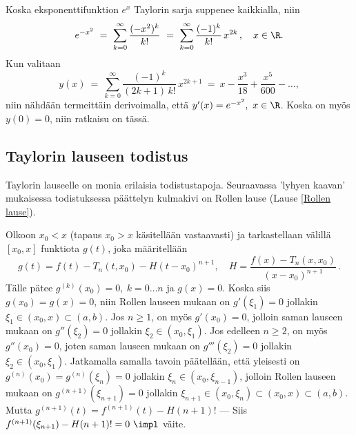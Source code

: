 \ratk Koska eksponenttifunktion $e^x$ Taylorin sarja suppenee kaikkialla, niin
\[ 
e^{-x^2}\ =\ \sum_{k=0}^\infty \frac{(-x^2)^k}{k!}\ 
          =\ \sum_{k=0}^\infty \frac{(-1)^k}{k!}\,x^{2k}\,, \quad x \in \R. 
\]
Kun valitaan
\[ 
y(x)\ =\ \sum_{k=0}^\infty \frac{(-1)^k}{(2k+1)\,k!}\,x^{2k+1}\ 
      =\ x - \frac{x^3}{18} + \frac{x^5}{600} - \ldots, 
\]
niin nähdään termeittäin derivoimalla, että $y'(x)=e^{-x^2},\ x\in\R$. Koska on myös $y(0)=0$,
niin ratkaisu on tässä. \loppu

\subsection*{Taylorin lauseen todistus}

Taylorin lauseelle on monia erilaisia todistustapoja. Seuraavassa
'lyhyen kaavan' mukaisessa todistuksessa päättelyn kulmakivi on Rollen lause
(Lause \ref{Rollen lause}).

Olkoon $x_0<x$ (tapaus $x_0>x$ käsitellään vastaavasti) ja tarkastellaan välillä $[x_0,x]$
funktiota $g(t)$, joka määritellään
\[
g(t) = f(t) - T_n(t,x_0) - H(t-x_0)^{n+1}, \quad H = \frac{f(x)-T_n(x,x_0)}{(x-x_0)^{n+1}}\,. 
\]
Tälle pätee $g^{(k)}(x_0)=0,\ k=0 \ldots n$ ja $g(x)=0$. Koska siis $g(x_0)=g(x)=0$, niin
Rollen lauseen mukaan on $g'(\xi_1)=0$ jollakin $\xi_1 \in (x_0,x)\subset(a,b)$. Jos $n \ge 1$,
on myös $g'(x_0)=0$, jolloin saman lauseen mukaan on $g''(\xi_2)=0$ jollakin
$\xi_2 \in (x_0,\xi_1)$. Jos edelleen $n \ge 2$, on myös $g''(x_0)=0$, joten saman lauseen
mukaan on $g'''(\xi_2)=0$ jollakin $\xi_2\in(x_0,\xi_1)$. Jatkamalla samalla tavoin päätellään,
että yleisesti on $g^{(n)}(x_0)=g^{(n)}(\xi_n)=0$ jollakin $\xi_n \in (x_0,\xi_{n-1})$, jolloin
Rollen lauseen mukaan on $g^{(n+1)}(\xi_{n+1})=0$ jollakin 
$\xi_{n+1} \in (x_0,\xi_n) \subset (x_0,x) \subset (a,b)$. Mutta 
$g^{(n+1)}(t) = f^{(n+1)}(t)-H(n+1)!$ --- Siis $f^{(n+1)}(\xi_{n+1})-H(n+1)!=0\ \impl$ väite.
\loppu

